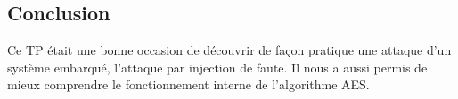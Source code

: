 
\subsection{Conclusion}

Ce TP était une bonne occasion de découvrir de façon pratique une attaque
d'un système embarqué, l'attaque par injection de faute.
Il nous a aussi permis de mieux comprendre le fonctionnement interne de
l'algorithme AES.
